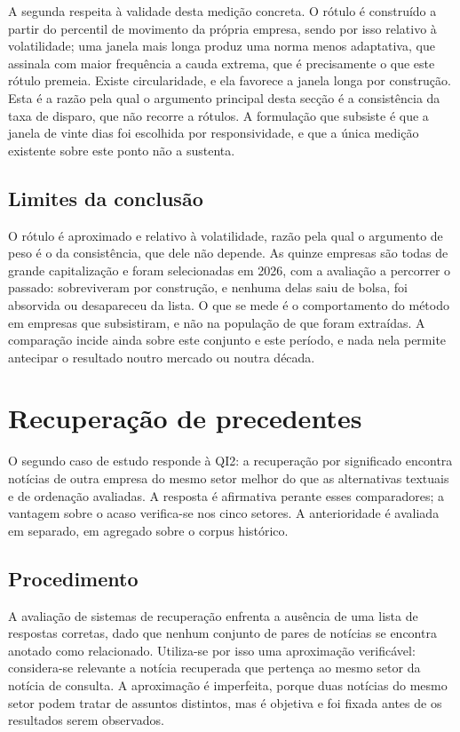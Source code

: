 A segunda respeita à validade desta medição
concreta. O rótulo é construído a partir do percentil de movimento da própria empresa, sendo por isso
relativo à volatilidade; uma janela mais longa produz uma norma menos adaptativa, que assinala com
maior frequência a cauda extrema, que é precisamente o que este rótulo premeia. Existe circularidade,
e ela favorece a janela longa por construção. Esta é a razão pela qual o argumento principal desta
secção é a consistência da taxa de disparo, que não recorre a rótulos. A formulação que subsiste é
que a janela de vinte dias foi escolhida por responsividade, e que a única medição existente sobre
este ponto não a sustenta.

\subsection{Limites da conclusão}

O rótulo é aproximado e relativo à volatilidade, razão pela qual o argumento de peso é o da
consistência, que dele não depende. As quinze empresas são todas de grande capitalização e foram
selecionadas em 2026, com a avaliação a percorrer o passado: sobreviveram por construção, e nenhuma
delas saiu de bolsa, foi absorvida ou desapareceu da lista. O que se mede é o comportamento do
método em empresas que subsistiram, e não na população de que foram extraídas. A comparação incide
ainda sobre este conjunto e este período, e nada nela permite antecipar o resultado noutro mercado
ou noutra década.

\section{Recuperação de precedentes}
\label{sec:av_qi2}

O segundo caso de estudo responde à \gls{QI}2: a recuperação por significado encontra notícias
de outra empresa do mesmo setor melhor do que as alternativas textuais e de ordenação avaliadas.
A resposta é afirmativa perante esses comparadores; a vantagem sobre o acaso verifica-se nos cinco
setores. A anterioridade é avaliada em separado, em agregado sobre o corpus histórico.

\subsection{Procedimento}

A avaliação de sistemas de recuperação enfrenta a ausência de uma lista de respostas corretas, dado
que nenhum conjunto de pares de notícias se encontra anotado como relacionado. Utiliza-se por isso
uma aproximação verificável: considera-se relevante a notícia recuperada que pertença ao mesmo setor
da notícia de consulta. A aproximação é imperfeita, porque duas notícias do mesmo setor podem tratar
de assuntos distintos, mas é objetiva e foi fixada antes de os resultados serem observados.


